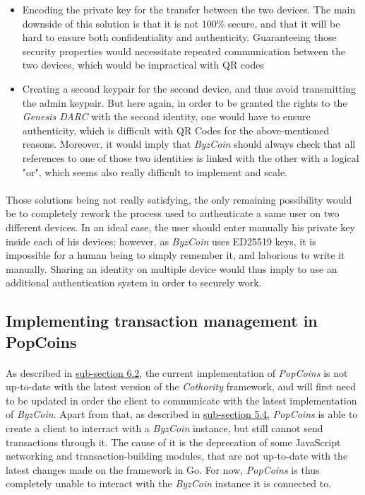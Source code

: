 \begin{itemize}
    \item Encoding the private key for the transfer between the two devices. The main downside of this solution is that it is not 100\% secure, and that it will be hard to ensure both confidentiality and authenticity. Guaranteeing those security properties would necessitate repeated communication between the two devices, which would be impractical with QR codes
    \item Creating a second keypair for the second device, and thus avoid transmitting the admin keypair. But here again, in order to be granted the rights to the \textit{Genesis DARC} with the second identity, one would have to ensure authenticity, which is difficult with QR Codes for the above-mentioned reasons. Moreover, it would imply that \textit{ByzCoin} should always check that all references to one of those two identities is linked with the other with a logical "or", which seems also really difficult to implement and scale.
\end{itemize}

\paragraph{}

Those solutions being not really satisfying, the only remaining possibility would be to completely rework the process used to authenticate a same user on two different devices. In an ideal case, the user should enter manually his private key inside each of his devices; however, as \textit{ByzCoin} uses ED25519 keys, it is impossible for a human being to simply remember it, and laborious to write it manually. Sharing an identity on multiple device would thus imply to use an additional authentication system in order to securely work.

\subsection{Implementing transaction management in PopCoins}
\label{subsection72}

\paragraph{}

As described in \hyperref[subsection62]{sub-section 6.2}, the current implementation of \textit{PopCoins} is not up-to-date with the latest version of the \textit{Cothority} framework, and will first need to be updated in order the client to communicate with the latest implementation of \textit{ByzCoin}. Apart from that, as described in \hyperref[subsection54]{sub-section 5.4}, \textit{PopCoins} is able to create a client to interract with a \textit{ByzCoin} instance, but still cannot send transactions through it. The cause of it is the deprecation of some JavaScript networking and transaction-building modules, that are not up-to-date with the latest changes made on the framework in Go. For now, \textit{PopCoins} is thus completely unable to interact with the \textit{ByzCoin} instance it is connected to.

